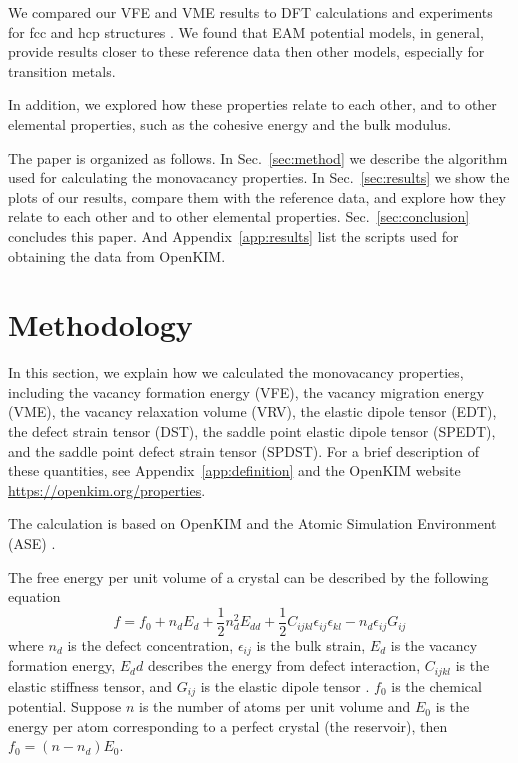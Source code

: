 \documentclass[%
 reprint,
 amsmath,amssymb,
 aps,
]{revtex4-1}
\begin{document}
We compared our VFE and VME results to DFT calculations and experiments for fcc and hcp structures \cite{angsten2014elemental}.
We found that EAM potential models, in general, provide results closer to these reference data then other models, especially for transition metals.

In addition, we explored how these properties relate to each other, and to other elemental properties, such as the cohesive energy and the bulk modulus.

The paper is organized as follows.
In Sec.~\ref{sec:method} we describe the algorithm used for calculating the monovacancy properties.
In Sec.~\ref{sec:results} we show the plots of our results, compare them with the reference data, and explore how they relate to each other and to other elemental properties.
Sec.~\ref{sec:conclusion} concludes this paper.
And Appendix~\ref{app:results} list the scripts used for obtaining the data from OpenKIM.

\section{\label{sec:method}Methodology}

In this section, we explain how we calculated the monovacancy properties, including the vacancy formation energy (VFE), the vacancy migration energy (VME), the vacancy relaxation volume (VRV), the elastic dipole tensor (EDT), the defect strain tensor (DST), the saddle point elastic dipole tensor (SPEDT), and the saddle point defect strain tensor (SPDST).
For a brief description of these quantities, see Appendix~\ref{app:definition} and the OpenKIM website \url{https://openkim.org/properties}.

The calculation is based on OpenKIM and the Atomic Simulation Environment (ASE) \cite{bahn2002object}.

The free energy per unit volume of a crystal can be described by the following equation
\begin{equation}\label{eq:f}
f = f_0 + n_dE_d + \frac{1}{2}n_d^2E_{dd} + \frac{1}{2}C_{ijkl}\epsilon_{ij}\epsilon_{kl} - n_d\epsilon_{ij}G_{ij}
\end{equation}
where $n_d$ is the defect concentration, $\epsilon_{ij}$ is the bulk strain, $E_d$ is the vacancy formation energy, $E_dd$ describes the energy from defect interaction, $C_{ijkl}$ is the elastic stiffness tensor, and $G_{ij}$ is the elastic dipole tensor \cite{freedman2009elastic}.
$f_0$ is the chemical potential.
Suppose $n$ is the number of atoms per unit volume and $E_0$ is the energy per atom corresponding to a perfect crystal (the reservoir), then $f_0 = (n - n_d) E_{0}$.
\end{document}
